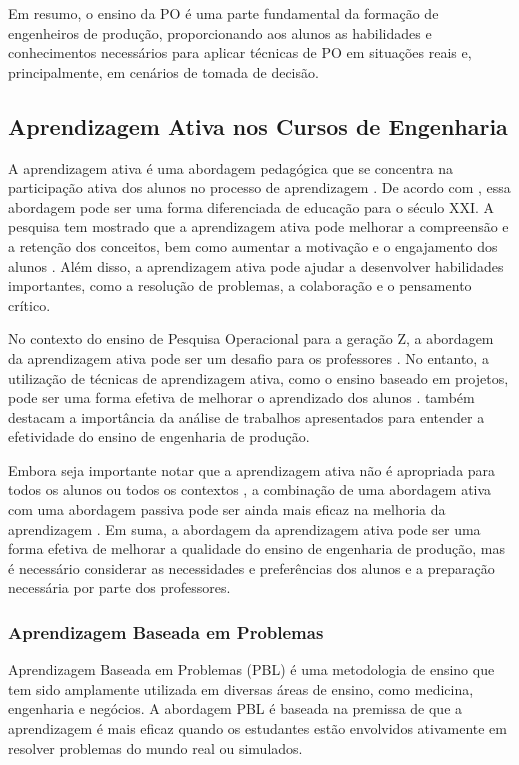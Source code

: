 \documentclass{article}
\begin{document}
Em resumo, o ensino da PO é uma parte fundamental da formação de engenheiros de produção, proporcionando aos alunos as habilidades e conhecimentos necessários para aplicar técnicas de PO em situações reais e, principalmente, em cenários de tomada de decisão.

\subsection{Aprendizagem Ativa nos Cursos de Engenharia}
A aprendizagem ativa é uma abordagem pedagógica que se concentra na participação ativa dos alunos no processo de aprendizagem \cite{elmor}. De acordo com , essa abordagem pode ser uma forma diferenciada de educação para o século XXI. A pesquisa tem mostrado que a aprendizagem ativa pode melhorar a compreensão e a retenção dos conceitos, bem como aumentar a motivação e o engajamento dos alunos \cite{debald}. Além disso, a aprendizagem ativa pode ajudar a desenvolver habilidades importantes, como a resolução de problemas, a colaboração e o pensamento crítico.

No contexto do ensino de Pesquisa Operacional para a geração Z, a abordagem da aprendizagem ativa pode ser um desafio para os professores \cite{cunha}. No entanto, a utilização de técnicas de aprendizagem ativa, como o ensino baseado em projetos, pode ser uma forma efetiva de melhorar o aprendizado dos alunos \cite{lima2016}.  também destacam a importância da análise de trabalhos apresentados para entender a efetividade do ensino de engenharia de produção.

Embora seja importante notar que a aprendizagem ativa não é apropriada para todos os alunos ou todos os contextos \cite{debald}, a combinação de uma abordagem ativa com uma abordagem passiva pode ser ainda mais eficaz na melhoria da aprendizagem \cite{elmor}. Em suma, a abordagem da aprendizagem ativa pode ser uma forma efetiva de melhorar a qualidade do ensino de engenharia de produção, mas é necessário considerar as necessidades e preferências dos alunos e a preparação necessária por parte dos professores.

\subsubsection{Aprendizagem Baseada em Problemas}
Aprendizagem Baseada em Problemas (PBL) é uma metodologia de ensino que tem sido amplamente utilizada em diversas áreas de ensino, como medicina, engenharia e negócios. A abordagem PBL é baseada na premissa de que a aprendizagem é mais eficaz quando os estudantes estão envolvidos ativamente em resolver problemas do mundo real ou simulados.
\end{document}
